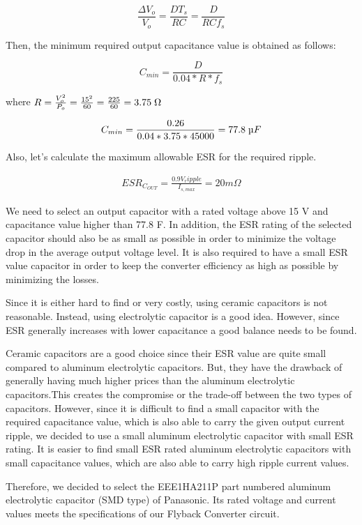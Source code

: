 $$ \frac{\Delta V_o }{V_o} = \frac{DT_s}{RC} = \frac{D}{RCf_s} $$

Then, the minimum required output capacitance value is obtained as follows:

$$ C_{min} = \frac{D}{0.04*R*f_s} $$

where $ R = \frac{V_o^2}{P_o} = \frac{15^2}{60} = \frac{225}{60} = 3.75\;\ohm $

$$ C_{min} = \frac{0.26}{0.04*3.75*45000} = 77.8\;\micro F $$

Also, let's calculate the maximum allowable ESR for the required ripple.

\begin{align*}
    ESR_{C_{OUT}}=\frac{0.9V_ripple}{I_{s,max}}=20m\Omega
\end{align*}

We need to select an output capacitor with a rated voltage above 15 V and capacitance value higher than 77.8 \micro F. In addition, the ESR rating of the selected capacitor should also be as small as
possible in order to minimize the voltage drop in the average output voltage level. It is also required to have a small ESR value capacitor in order to keep the converter efficiency as high as possible by minimizing the losses.

Since it is either hard to find or very costly, using ceramic capacitors is not reasonable. Instead, using electrolytic capacitor is a good idea. However, since ESR generally increases with lower capacitance a good balance needs to be found.

Ceramic capacitors are a good choice since their ESR value are quite small compared to aluminum electrolytic capacitors. But, they have the drawback of generally having much higher prices than the aluminum electrolytic capacitors.This creates the compromise or the trade-off between the two types of capacitors. However, since it is difficult to find a small capacitor with the required capacitance value, which is also able to carry the given output current ripple, we decided to use a small aluminum electrolytic capacitor with small ESR rating. It is easier to find small ESR rated aluminum electrolytic capacitors with small capacitance values, which are also able to carry high ripple current values.

Therefore, we decided to select the EEE1HA211P part numbered aluminum electrolytic capacitor (SMD type) of Panasonic. Its rated voltage and current values meets the specifications of our Flyback Converter circuit.

